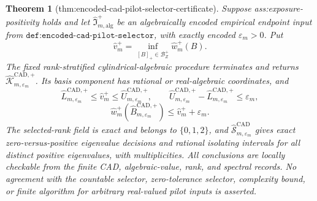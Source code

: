 \documentclass{article}
\newtheorem{theorem}{Theorem}
\begin{document}
\begin{theorem}[thm:encoded-cad-pilot-selector-certificate]\label{thm:encoded-cad-pilot-selector-certificate}
Suppose ass:exposure-positivity holds and let \(\widehat{\mathfrak I}_{m,\mathrm{alg}}^+\) be an algebraically encoded empirical endpoint input from \(\texttt{def:encoded-cad-pilot-selector}\), with exactly encoded \(\varepsilon_m>0\).  Put
\[
\widehat v_m^+=\inf_{[B]_+\in\mathcal B_Z^+}\widehat w_m^+(B).
\]
The fixed rank-stratified cylindrical-algebraic procedure terminates and returns \(\widehat{\mathscr K}_{m,\varepsilon_m}^{\mathrm{CAD},+}\).  Its basis component has rational or real-algebraic coordinates, and
\[
\widehat L_{m,\varepsilon_m}^{\mathrm{CAD},+}
\le\widehat v_m^+
\le\widehat U_{m,\varepsilon_m}^{\mathrm{CAD},+},
\qquad
\widehat U_{m,\varepsilon_m}^{\mathrm{CAD},+}
-\widehat L_{m,\varepsilon_m}^{\mathrm{CAD},+}
\le\varepsilon_m,
\]
\[
\widehat w_m^+(\widehat B_{m,\varepsilon_m}^{\mathrm{CAD},+})
\le\widehat v_m^++\varepsilon_m.
\]
The selected-rank field is exact and belongs to \(\{0,1,2\}\), and \(\widehat{\mathscr S}_{m,\varepsilon_m}^{\mathrm{CAD}}\) gives exact zero-versus-positive eigenvalue decisions and rational isolating intervals for all distinct positive eigenvalues, with multiplicities.  All conclusions are locally checkable from the finite CAD, algebraic-value, rank, and spectral records.  No agreement with the countable selector, zero-tolerance selector, complexity bound, or finite algorithm for arbitrary real-valued pilot inputs is asserted.
\end{theorem}
\end{document}
